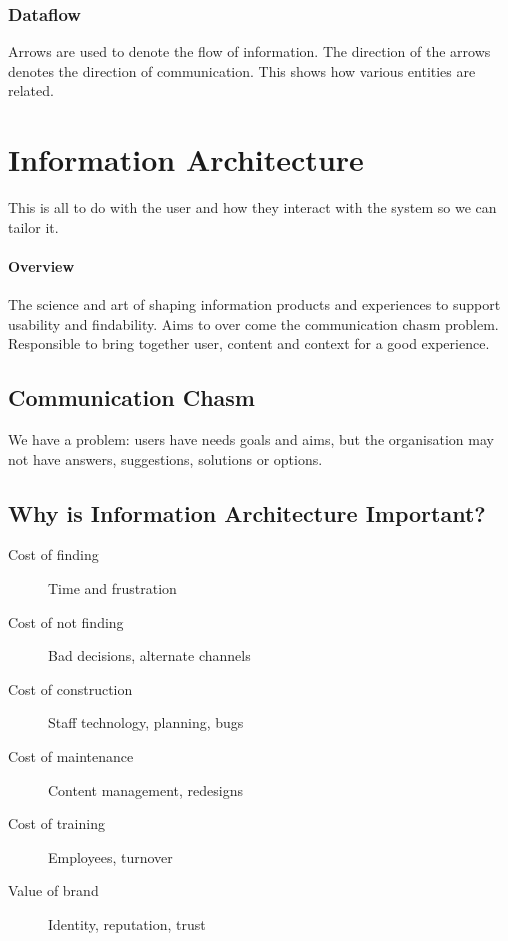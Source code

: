 \subsubsection{Dataflow}\label{ssub:dataflow_was}

Arrows are used to denote the flow of information.
The direction of the arrows denotes the direction of communication.
This shows how various entities are related.

\section{Information Architecture}\label{sec:information_architecture}

This is all to do with the user and how they interact with the system so we can tailor it.

\paragraph{Overview}\label{par:overview_was}

The science and art of shaping information products and experiences to support usability and findability.
Aims to over come the communication chasm problem.
Responsible  to bring together user, content and context for a good experience.

\subsection{Communication Chasm}\label{sub:communication_chasm}

We have a problem: users have needs goals and aims, but the organisation may not have answers, suggestions, solutions or options.

\subsection{Why is Information Architecture Important?}\label{sub:why_is_information_architecture_important_}

\begin{description}
    \item[Cost of finding] Time and frustration
    \item[Cost of not finding] Bad decisions, alternate channels
    \item[Cost of construction] Staff technology, planning, bugs
    \item[Cost of maintenance] Content management, redesigns
    \item[Cost of training] Employees, turnover
    \item[Value of brand] Identity, reputation, trust
\end{description}

